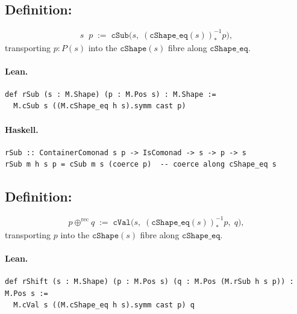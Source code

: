 \documentclass[11pt,a4paper]{article}
\begin{document}
\subsection{Definition: }

\begin{defn}
\[
  s \mathop{\downarrow^\mathrm{rec}} p
  \;:=\;
  \mathtt{cSub}\bigl(s,\; (\mathtt{cShape\_eq}(s))^{-1}_* p\bigr),
\]
transporting $p : P(s)$ into the $\mathtt{cShape}(s)$ fibre along
$\mathtt{cShape\_eq}$.
\end{defn}

\paragraph{Lean.}
\begin{lstlisting}[style=lean]
def rSub (s : M.Shape) (p : M.Pos s) : M.Shape :=
  M.cSub s ((M.cShape_eq h s).symm cast p)
\end{lstlisting}

\paragraph{Haskell.}
\begin{lstlisting}[style=haskell]
rSub :: ContainerComonad s p -> IsComonad -> s -> p -> s
rSub m h s p = cSub m s (coerce p)  -- coerce along cShape_eq s
\end{lstlisting}


\subsection{Definition: }

\begin{defn}
\[
  p \oplus^\mathrm{rec} q
  \;:=\;
  \mathtt{cVal}\bigl(s,\; (\mathtt{cShape\_eq}(s))^{-1}_* p,\; q\bigr),
\]
transporting $p$ into the $\mathtt{cShape}(s)$ fibre along $\mathtt{cShape\_eq}$.
\end{defn}

\paragraph{Lean.}
\begin{lstlisting}[style=lean]
def rShift (s : M.Shape) (p : M.Pos s) (q : M.Pos (M.rSub h s p)) : M.Pos s :=
  M.cVal s ((M.cShape_eq h s).symm cast p) q
\end{lstlisting}
\end{document}
